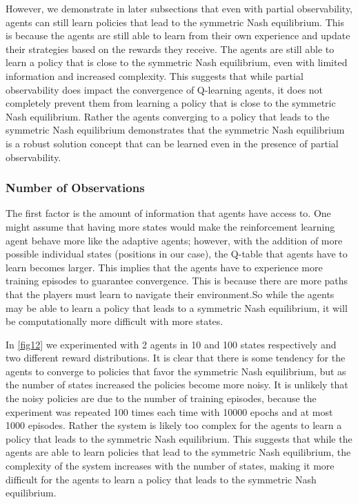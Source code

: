 \documentclass{article}
\begin{document}
                However, we demonstrate in later subsections that even with partial observability, agents can still learn policies that lead to the symmetric Nash equilibrium. This is because the agents are still able to learn from their own experience and update their strategies based on the rewards they receive. The agents are still able to learn a policy that is close to the symmetric Nash equilibrium, even with limited information and increased complexity. This suggests that while partial observability does impact the convergence of Q-learning agents, it does not completely prevent them from learning a policy that is close to the symmetric Nash equilibrium. Rather the agents converging to a policy that leads to the symmetric Nash equilibrium demonstrates that the symmetric Nash equilibrium is a robust solution concept that can be learned even in the presence of partial observability. 
              
    
            \subsubsection{Number of Observations}
                The first factor is the amount of information that agents have access to. One might assume that having more states would make the reinforcement learning agent behave more like the adaptive agents; however, with the addition of more possible individual states (positions in our case), the Q-table that agents have to learn becomes larger. This implies that the agents have to experience more training episodes to guarantee convergence. This is because there are more paths that the players must learn to navigate their environment.So while the agents may be able to learn a policy that leads to a symmetric Nash equilibrium, it will be computationally more difficult with more states.
    
                In \cref{fig12} we experimented with 2 agents in 10 and 100 states respectively and two different reward distributions. It is clear that there is some tendency for the agents to converge to policies that favor the symmetric Nash equilibrium, but as the number of states increased the policies become more noisy. It is unlikely that the noisy policies are due to the number of training episodes, because the experiment was repeated 100 times each time with 10000 epochs and at most 1000 episodes. Rather the system is likely too complex for the agents to learn a policy that leads to the symmetric Nash equilibrium. This suggests that while the agents are able to learn policies that lead to the symmetric Nash equilibrium, the complexity of the system increases with the number of states, making it more difficult for the agents to learn a policy that leads to the symmetric Nash equilibrium.
                
\end{document}
